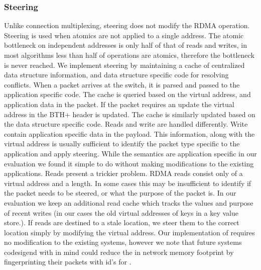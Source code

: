%

\subsubsection{Steering}

Unlike connection multiplexing, steering does not modify the
RDMA operation. Steering is used when atomics are not
applied to a single address. The atomic bottleneck on
independent addresses is only half of that of reads and
writes, in most algorithms less than half of operations are
atomics, therefore the bottleneck is never reached. 
We implement steering by maintaining a cache of centralized
data structure information, and data structure specific code
for resolving conflicts. When a packet arrives at the
switch, it is parsed and passed to the application specific
code. The cache is queried based on the virtual address, and
application data in the packet. If the packet requires an
update the virtual address in the BTH+ header is updated.
The cache is similarly updated based on the data structure
specific code.
Reads and write are handled differently. Write contain
application specific data in the payload. This information,
along with the virtual address is usually sufficient to
identify the packet type specific to the application and
apply steering. While the semantics are application specific
in our evaluation we found it simple to do without making
modifications to the existing applications.
Reads present a trickier problem. RDMA reads consist only of
a virtual address and a length. In some cases this may be
insufficient to identify if the packet needs to be steered,
or what the purpose of the packet is. In our evaluation we
keep an additional read cache which tracks the values and
purpose of recent writes (in our cases the old virtual
addresses of keys in a key value store.). If reads are
destined to a stale location, we steer them to the correct
location simply by modifying the virtual address.
Our implementation of \sword requires no modification to the
existing systems, however we note that future systems
codesigend with \sword in mind could reduce the in network
memory footprint by fingerprinting their packets with id's
for {\sword}.

